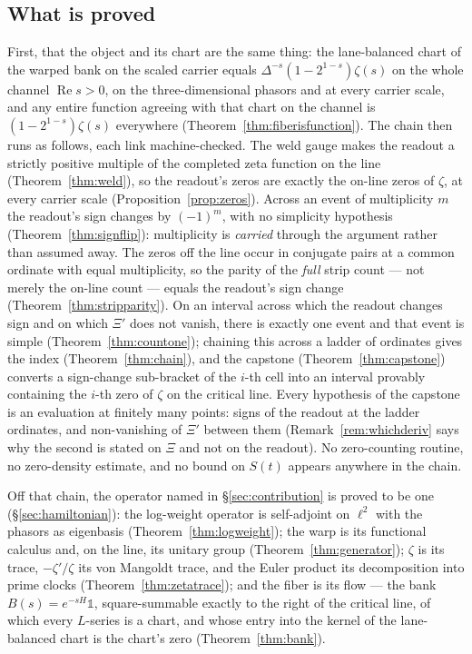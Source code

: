 \documentclass[11pt]{article}
\theoremstyle{plain}
\theoremstyle{definition}
\theoremstyle{remark}
\begin{document}
\subsection*{What is proved}
First, that the object and its chart are the same thing: the lane-balanced chart of the
warped bank on the scaled carrier equals $\Delta^{-s}(1-2^{1-s})\zeta(s)$ on the whole
channel $\operatorname{Re}s>0$, on the three-dimensional phasors and at every carrier
scale, and any entire function agreeing with that chart on the channel is
$(1-2^{1-s})\zeta(s)$ everywhere (Theorem~\ref{thm:fiberisfunction}). The chain then runs
as follows, each link machine-checked. The weld gauge makes the readout
a strictly positive multiple of the completed zeta function on the line
(Theorem~\ref{thm:weld}), so the readout's zeros are exactly the on-line zeros of
$\zeta$, at every carrier scale (Proposition~\ref{prop:zeros}). Across an event of
multiplicity $m$ the readout's sign changes by $(-1)^m$, with no simplicity hypothesis
(Theorem~\ref{thm:signflip}): multiplicity is \emph{carried} through the argument
rather than assumed away. The zeros off the line occur in conjugate pairs at a common
ordinate with equal multiplicity, so the parity of the \emph{full} strip count --- not
merely the on-line count --- equals the readout's sign change
(Theorem~\ref{thm:stripparity}). On an interval across which the readout changes sign
and on which $\Xi'$ does not vanish, there is exactly one event and that event
is simple (Theorem~\ref{thm:countone}); chaining this across a ladder of ordinates
gives the index (Theorem~\ref{thm:chain}), and the capstone
(Theorem~\ref{thm:capstone}) converts a sign-change sub-bracket of the $i$-th cell into
an interval provably containing the $i$-th zero of $\zeta$ on the critical line. Every
hypothesis of the capstone is an evaluation at finitely many points: signs of the
readout at the ladder ordinates, and non-vanishing of $\Xi'$ between them
(Remark~\ref{rem:whichderiv} says why the second is stated on $\Xi$ and not on the
readout). No zero-counting routine, no zero-density estimate, and no bound on $S(t)$
appears anywhere in the chain.

Off that chain, the operator named in \S\ref{sec:contribution} is proved to be one
(\S\ref{sec:hamiltonian}): the log-weight operator is self-adjoint on $\ell^2$ with the
phasors as eigenbasis (Theorem~\ref{thm:logweight}); the warp is its functional calculus
and, on the line, its unitary group (Theorem~\ref{thm:generator}); $\zeta$ is its trace,
$-\zeta'/\zeta$ its von Mangoldt trace, and the Euler product its decomposition into
prime clocks (Theorem~\ref{thm:zetatrace}); and the fiber is its flow --- the bank
$B(s)=e^{-sH}\mathbb 1$, square-summable exactly to the right of the critical line, of
which every $L$-series is a chart, and whose entry into the kernel of the lane-balanced
chart is the chart's zero (Theorem~\ref{thm:bank}).
\end{document}
